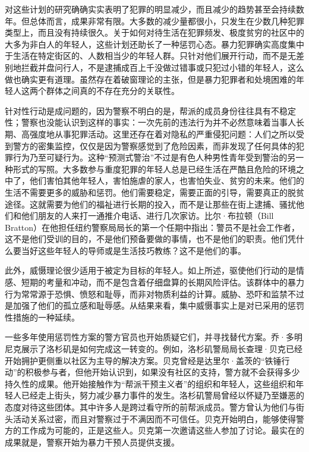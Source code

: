 \documentclass[fontset=fandol, a4paper, 12pt, openright]{ctexbook}
\begin{document}
对这些计划的研究确确实实表明了犯罪的明显减少，而且减少的趋势甚至会持续数年。但总体而言，成果非常有限。大多数的减少量都很小，只发生在少数几种犯罪类型上，而且没有持续很久。关于如何对待生活在犯罪频发、极度贫穷的社区中的大多为非白人的年轻人，这些计划还助长了一种惩罚心态。暴力犯罪确实高度集中于生活在特定街区的、人数相当少的年轻人群。只针对他们展开行动，而不是无差别地拦截并盘问行人，不是逮捕成百上千没做过错事或只犯过小错的年轻人，这么做也确实更有道理。虽然存在着破窗理论的主张，但是暴力犯罪者和处境困难的年轻人这两个群体之间真的不存在充分的关联性。

针对性行动是成问题的，因为警察不明白的是，帮派的成员身份往往具有不稳定性；警察也没能认识到这样的事实：一次先前的违法行为并不必然意味着当事人长期、高强度地从事犯罪活动。这里还存在着对隐私的严重侵犯问题：人们之所以受到警方的密集监控，仅仅是因为警察感觉到了危险因素，而非发现了任何具体的犯罪行为乃至可疑行为。这种“预测式警治”不过是有色人种男性青年受到警治的另一种形式的写照。大多数参与重度犯罪的年轻人总是已经生活在严酷且危险的环境之中了，他们害怕其他年轻人，害怕施虐的家人，也害怕失业、贫穷的未来。他们的生活不需要更多的威胁和惩罚。他们需要稳定，需要正面的引导，需要真正的脱贫途径。这就需要为他们的福祉进行长期的投入，而不是让那些在街上逮捕、骚扰他们和他们朋友的人来打一通推介电话、进行几次家访。比尔·布拉顿（Bill Bratton）在他担任纽约警察局局长的第一个任期中指出：警员不是社会工作者，这不是他们受训的目的，不是他们预备要做的事情，也不是他们的职责。他们凭什么要当好这些年轻人的导师或是生活技巧教练？这不是他们的事。

此外，威慑理论很少适用于被定为目标的年轻人。如上所述，驱使他们行动的是情感、短期的考量和冲动，而不是包含着仔细盘算的长期风险评估。该群体中的暴力行为常常源于恐惧、愤怒和耻辱，而非对物质利益的计算。威胁、恐吓和监禁不过是加强了他们的孤立感和耻辱感。从结果来看，集中威慑事实上是对已采用的惩罚性措施的一种延续。

一些多年使用惩罚性方案的警方官员也开始质疑它们，并寻找替代方案。乔·多明尼克展示了洛杉矶是如何完成这一转变的。例如，洛杉矶警局局长查理·贝克已经开始拥护更侧重以社区为主导的解决方案。贝克曾经是达里尔·盖茨的“铁锤行动”的积极参与者，但他开始认识到，如果没有社区的支持，警方就不会获得多少持久性的成果。他开始接触作为“帮派干预主义者”的组织和年轻人，这些组织和年轻人已经走上街头，努力减少暴力事件的发生。洛杉矶警局曾经以怀疑乃至嫌恶的态度对待这些团体。其中许多人是跨过看守所的前帮派成员。警方曾认为他们与街头活动关系过密，而且对警察过于不满因而不可信任。贝克开始明白，能够使得警方的工作成为可能的，正是这些人。贝克第一次邀请这些人参加了讨论。最实在的成果就是，警察开始为暴力干预人员提供支援。
\end{document}
